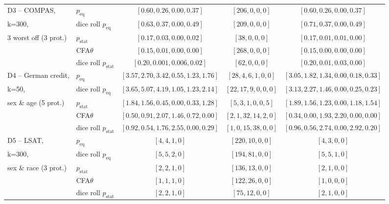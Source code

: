 \begin{table}[t!]
{\begin{tabular}{llccc}
			\midrule
			\midrule
			D3 -- COMPAS, 			& \algoFAIR  $p_{\text{eq}}$ 	& $[0.60, 0.26, 0.00, 0.37]$ 	& $[206, 0, 0, 0]$ 		& $[0.60, 0.26, 0.00, 0.37]$ \\
			k=300,					& dice roll $p_{\text{eq}}$ 	& $[0.63, 0.37, 0.00, 0.49]$ & $[209, 0, 0, 0]$ 	& $[0.71, 0.37, 0.00, 0.49]$ \\
									\cline{2-5}
			3 worst off (3 prot.)	& \algoFAIR  $p_{\text{stat}}$ 	& $[0.17, 0.03, 0.00, 0.02]$ & $[38, 0, 0, 0]$ 				& $[0.17, 0.01,0.01, 0.00] $  \\
								 	& CFA$\theta$ 					& $[0.15, 0.01, 0.00, 0.00] $ & $[268, 0, 0, 0]$ 	& $[0.15, 0.00, 0.00, 0.00]$   \\
									& dice roll $p_{\text{stat}}$ 	& $[0.20, 0.001, 0.006, 0.02]$ & $[62, 0, 0, 0]$ 		& $[0.20, 0.01, 0.03, 0.00]$ \\

			\midrule
			\midrule
			D4 -- German credit, 	& \algoFAIR $p_{\text{eq}}$ 	&  $[3.57, 2.70, 3.42, 0.55, 1.23, 1.76]$ 	& $[28, 4, 6, 1, 0, 0]$ 	& $[3.05, 1.82, 1.34, 0.00, 0.18, 0.33]$ \\
			k=50,					& dice roll $p_{\text{eq}}$ 	& $[3.65, 5.07, 4.19, 1.05, 1.23, 2.14]$ & $[22, 17, 9, 0, 0, 0]$ 	& $[3.13, 2.27, 1.46, 0.00, 0.25, 0.23]$ \\
									\cline{2-5}
			sex \& age (5 prot.) 	& \algoFAIR $p_{\text{stat}}$ & $[1.84, 1.56, 0.45, 0.00, 0.33, 1.28]$ & $[5, 3, 1, 0, 0, 5]$ & $[1.89, 1.56, 1.23, 0.00, 1.18, 1.54]$  \\
									& CFA$\theta$ &  $[0.50, 0.91, 2.07, 1.46, 0.72, 0.00]$ & $[2, 1, 32, 14, 2, 0]$ & $[0.34, 0.00, 1.93, 2.20, 0.00, 0.00]$ \\
									& dice roll $p_{\text{stat}}$ 	& $[0.92, 0.54, 1.76, 2.55, 0.00, 0.29]$ & $[1, 0, 15, 38, 0, 0]$ 		& $[0.96, 0.56, 2.74, 0.00, 2.92, 0.20]$ \\

			\midrule
			\midrule
			D5 -- LSAT, 			& \algoFAIR $p_{\text{eq}}$ 	& $[4, 4, 1, 0]$	& $[220, 10, 0, 0]$ & $[4, 3, 0, 0]$  \\
			k=300, 					& dice roll $p_{\text{eq}}$ 	& $[5, 5, 2, 0]$ & $[194, 81, 0, 0]$ 	& $[5, 5, 1, 0]$ \\
									\cline{2-5}
			sex \& race (3 prot.) 	& \algoFAIR $p_{\text{stat}}$ 	& $[2, 2, 1, 0]$ 	& $[136, 13, 0, 0]$ & $[2, 1, 0, 0]$  \\
									& CFA$\theta$ 					& $[1, 1, 1, 0]$ 	& $[122, 26, 0, 0]$ & $[1, 0, 0, 0]$  \\
									& dice roll $p_{\text{stat}}$ 	& $[2, 2, 1, 0]$ & $[75, 12, 0, 0]$ 	& $[2, 1, 0, 0]$ \\
			\bottomrule
		\end{tabular}
	}
\end{table}
